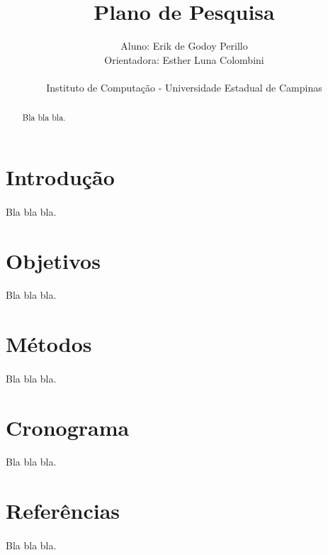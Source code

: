 \documentclass[11pt]{article}
\begin{document}
\title{Plano de Pesquisa}
\author{Aluno: Erik de Godoy Perillo\\
		Orientadora: Esther Luna Colombini\\
		\\
		Instituto de Computação - Universidade Estadual de Campinas}
\date{}
\maketitle
\begin{abstract}
Bla bla bla.
\end{abstract}

\newpage


\section{Introdução}
\paragraph{}
Bla bla bla.

\section{Objetivos}
\paragraph{}
Bla bla bla.

\section{Métodos}
\paragraph{}
Bla bla bla.

\section{Cronograma}
\paragraph{}
Bla bla bla.

\section{Referências}
\paragraph{}
Bla bla bla.
\end{document}
